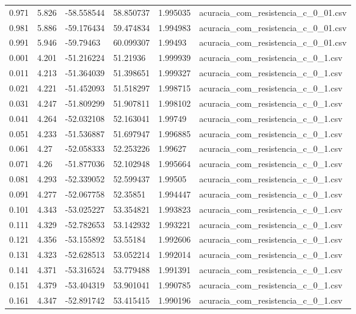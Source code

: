 \begin{table}
\begin{tabular}{llllll}
0.971 & 5.826 & -58.558544 & 58.850737 & 1.995035 & acuracia\_com\_resistencia\_c\_0\_01.csv \\
0.981 & 5.886 & -59.176434 & 59.474834 & 1.994983 & acuracia\_com\_resistencia\_c\_0\_01.csv \\
0.991 & 5.946 & -59.79463 & 60.099307 & 1.99493 & acuracia\_com\_resistencia\_c\_0\_01.csv \\
0.001 & 4.201 & -51.216224 & 51.21936 & 1.999939 & acuracia\_com\_resistencia\_c\_0\_1.csv \\
0.011 & 4.213 & -51.364039 & 51.398651 & 1.999327 & acuracia\_com\_resistencia\_c\_0\_1.csv \\
0.021 & 4.221 & -51.452093 & 51.518297 & 1.998715 & acuracia\_com\_resistencia\_c\_0\_1.csv \\
0.031 & 4.247 & -51.809299 & 51.907811 & 1.998102 & acuracia\_com\_resistencia\_c\_0\_1.csv \\
0.041 & 4.264 & -52.032108 & 52.163041 & 1.99749 & acuracia\_com\_resistencia\_c\_0\_1.csv \\
0.051 & 4.233 & -51.536887 & 51.697947 & 1.996885 & acuracia\_com\_resistencia\_c\_0\_1.csv \\
0.061 & 4.27 & -52.058333 & 52.253226 & 1.99627 & acuracia\_com\_resistencia\_c\_0\_1.csv \\
0.071 & 4.26 & -51.877036 & 52.102948 & 1.995664 & acuracia\_com\_resistencia\_c\_0\_1.csv \\
0.081 & 4.293 & -52.339052 & 52.599437 & 1.99505 & acuracia\_com\_resistencia\_c\_0\_1.csv \\
0.091 & 4.277 & -52.067758 & 52.35851 & 1.994447 & acuracia\_com\_resistencia\_c\_0\_1.csv \\
0.101 & 4.343 & -53.025227 & 53.354821 & 1.993823 & acuracia\_com\_resistencia\_c\_0\_1.csv \\
0.111 & 4.329 & -52.782653 & 53.142932 & 1.993221 & acuracia\_com\_resistencia\_c\_0\_1.csv \\
0.121 & 4.356 & -53.155892 & 53.55184 & 1.992606 & acuracia\_com\_resistencia\_c\_0\_1.csv \\
0.131 & 4.323 & -52.628513 & 53.052214 & 1.992014 & acuracia\_com\_resistencia\_c\_0\_1.csv \\
0.141 & 4.371 & -53.316524 & 53.779488 & 1.991391 & acuracia\_com\_resistencia\_c\_0\_1.csv \\
0.151 & 4.379 & -53.404319 & 53.901041 & 1.990785 & acuracia\_com\_resistencia\_c\_0\_1.csv \\
0.161 & 4.347 & -52.891742 & 53.415415 & 1.990196 & acuracia\_com\_resistencia\_c\_0\_1.csv \\

\end{tabular}
\end{table}
